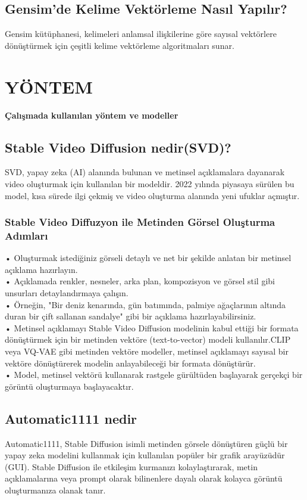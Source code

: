 \documentclass[12pt, a4paper]{article}
\begin{document}
	\subsection{Gensim'de Kelime Vektörleme Nasıl Yapılır?}
	Gensim kütüphanesi, kelimeleri anlamsal ilişkilerine göre sayısal vektörlere dönüştürmek için çeşitli kelime vektörleme algoritmaları sunar. 
	
	
	
	\section{YÖNTEM}
	\textbf{Çalışmada kullanılan yöntem ve modeller}
	\subsection{Stable Video Diffusion nedir(SVD)?}	
	SVD, yapay zeka (AI) alanında bulunan ve metinsel açıklamalara dayanarak video oluşturmak için kullanılan bir modeldir. 2022 yılında piyasaya sürülen bu model, kısa sürede ilgi çekmiş ve video oluşturma alanında yeni ufuklar açmıştır.\cite{yakar2020yapay}\\			
	
	\subsubsection{Stable Video Diffuzyon ile Metinden Görsel Oluşturma Adımları}
	•	Oluşturmak istediğiniz görseli detaylı ve net bir şekilde anlatan bir metinsel açıklama hazırlayın.\\
	•	Açıklamada renkler, nesneler, arka plan, kompozisyon ve görsel stil gibi unsurları detaylandırmaya çalışın.\\
	•	Örneğin, "Bir deniz kenarında, gün batımında, palmiye ağaçlarının altında duran bir çift sallanan sandalye" gibi bir açıklama hazırlayabilirsiniz.\\
	•	Metinsel açıklamayı Stable Video Diffusion modelinin kabul ettiği bir formata dönüştürmek için bir metinden vektöre (text-to-vector) modeli kullanılır.CLIP veya VQ-VAE gibi metinden vektöre modeller, metinsel açıklamayı sayısal bir vektöre dönüştürerek modelin anlayabileceği bir formata dönüştürür.\\
	•	Model, metinsel vektörü kullanarak rastgele gürültüden başlayarak gerçekçi bir görüntü oluşturmaya başlayacaktır.\cite{yakar2020yapay}

	\subsection{Automatic1111 nedir}
	Automatic1111, Stable Diffusion isimli metinden görsele dönüştüren güçlü bir yapay zeka modelini kullanmak için kullanılan popüler bir grafik arayüzüdür (GUI). Stable Diffusion ile etkileşim kurmanızı kolaylaştırarak, metin açıklamalarına veya prompt olarak bilinenlere dayalı olarak kolayca görüntü oluşturmanıza olanak tanır.\cite{Automatic1111}
	
\end{document}
